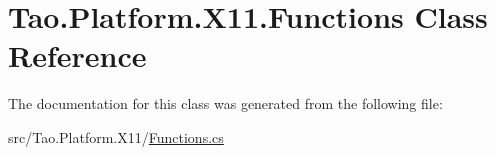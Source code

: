 \hypertarget{class_tao_1_1_platform_1_1_x11_1_1_functions}{
\section{Tao.Platform.X11.Functions Class Reference}
\label{class_tao_1_1_platform_1_1_x11_1_1_functions}
}


The documentation for this class was generated from the following file:\begin{DoxyCompactItemize}
\item 
src/Tao.Platform.X11/\hyperlink{_functions_8cs}{Functions.cs}\end{DoxyCompactItemize}
